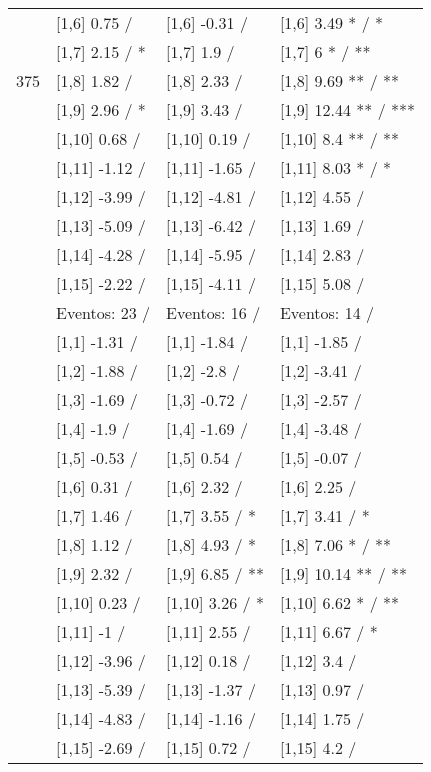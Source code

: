 \begin{table}
\begin{tabular}[t]{llll}
 & {}[1,6] 0.75  / & {}[1,6] -0.31  / & {}[1,6] 3.49 * / *\\
 & {}[1,7] 2.15  / * & {}[1,7] 1.9  / & {}[1,7] 6 * / **\\
375 & {}[1,8] 1.82  / & {}[1,8] 2.33  / & {}[1,8] 9.69 ** / **\\
\addlinespace
 & {}[1,9] 2.96  / * & {}[1,9] 3.43  / & {}[1,9] 12.44 ** / ***\\
 & {}[1,10] 0.68  / & {}[1,10] 0.19  / & {}[1,10] 8.4 ** / **\\
 & {}[1,11] -1.12  / & {}[1,11] -1.65  / & {}[1,11] 8.03 * / *\\
 & {}[1,12] -3.99  / & {}[1,12] -4.81  / & {}[1,12] 4.55  /\\
 & {}[1,13] -5.09  / & {}[1,13] -6.42  / & {}[1,13] 1.69  /\\
\addlinespace
 & {}[1,14] -4.28  / & {}[1,14] -5.95  / & {}[1,14] 2.83  /\\
 & {}[1,15] -2.22  / & {}[1,15] -4.11  / & {}[1,15] 5.08  /\\
 & Eventos:  23 / & Eventos:  16 / & Eventos:  14 /\\
 & {}[1,1] -1.31  / & {}[1,1] -1.84  / & {}[1,1] -1.85  /\\
 & {}[1,2] -1.88  / & {}[1,2] -2.8  / & {}[1,2] -3.41  /\\
\addlinespace
 & {}[1,3] -1.69  / & {}[1,3] -0.72  / & {}[1,3] -2.57  /\\
 & {}[1,4] -1.9  / & {}[1,4] -1.69  / & {}[1,4] -3.48  /\\
 & {}[1,5] -0.53  / & {}[1,5] 0.54  / & {}[1,5] -0.07  /\\
 & {}[1,6] 0.31  / & {}[1,6] 2.32  / & {}[1,6] 2.25  /\\
 & {}[1,7] 1.46  / & {}[1,7] 3.55  / * & {}[1,7] 3.41  / *\\
\addlinespace
500 & {}[1,8] 1.12  / & {}[1,8] 4.93  / * & {}[1,8] 7.06 * / **\\
 & {}[1,9] 2.32  / & {}[1,9] 6.85  / ** & {}[1,9] 10.14 ** / **\\
 & {}[1,10] 0.23  / & {}[1,10] 3.26  / * & {}[1,10] 6.62 * / **\\
 & {}[1,11] -1  / & {}[1,11] 2.55  / & {}[1,11] 6.67  / *\\
 & {}[1,12] -3.96  / & {}[1,12] 0.18  / & {}[1,12] 3.4  /\\
\addlinespace
 & {}[1,13] -5.39  / & {}[1,13] -1.37  / & {}[1,13] 0.97  /\\
 & {}[1,14] -4.83  / & {}[1,14] -1.16  / & {}[1,14] 1.75  /\\
 & {}[1,15] -2.69  / & {}[1,15] 0.72  / & {}[1,15] 4.2  /\\
\bottomrule
\end{tabular}
\end{table}
